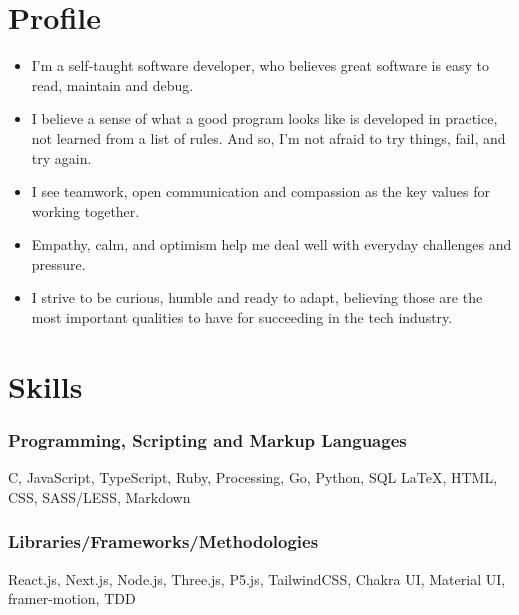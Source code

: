 \documentclass[11pt, oneside, a4paper, titlepage]{article}
\newcommand\skillsVSpace{\vspace{-0.3cm}}
\begin{document}
\begin{tcolorbox}
  \begin{minipage}[t]{8cm}
    \vspace*{-0.5cm}
    \begin{tcolorbox}[grow to left by=0.6cm,colback=gray!25,colframe=white]

      \section*{Profile}
      \begin{itemize}
        \item{
      I'm a self-taught software developer,
      who believes great software is easy to read,
      maintain and debug.
          }
        \skillsVSpace
      \item{
      I believe a sense of what a good program looks like
      is developed in practice, not learned from a list of rules.
      And so, I'm not afraid to try things, fail, and try again.
       }
        \skillsVSpace
        \item{
      I see teamwork, open communication and compassion
      as the key values for working together.
          }
        \skillsVSpace
        \item{
      Empathy, calm, and optimism
      help me deal well with everyday challenges and pressure.
        }
        \skillsVSpace
      \item{
      I strive to be curious, humble and ready to adapt,
      believing those are the most important qualities to have
      for succeeding in the tech industry.
        }
      \end{itemize}


      \section*{Skills}
        \subsubsection{Programming, Scripting and Markup Languages}
        C, JavaScript, TypeScript, Ruby, Processing, Go, Python, SQL {\LaTeX}, HTML, CSS, SASS/LESS, Markdown
        \skillsVSpace
        \subsubsection{Libraries/Frameworks/Methodologies}
        React.js, Next.js, Node.js, Three.js, P5.js, TailwindCSS, Chakra UI, Material UI, framer-motion, TDD


\end{tcolorbox}
\end{minipage}
\end{tcolorbox}
\end{document}
